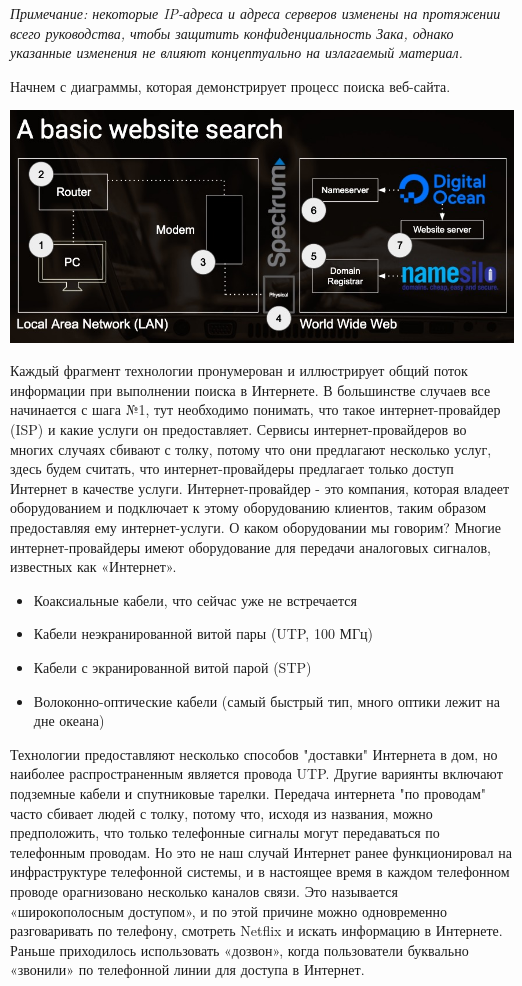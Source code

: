 \documentclass{article}
\begin{document}
\emph{Примечание: некоторые IP-адреса и адреса серверов изменены на
протяжении всего руководства, чтобы защитить конфиденциальность Зака,
однако указанные изменения не влияют концептуально на излагаемый
материал.}

Начнем с диаграммы, которая демонстрирует процесс поиска веб-сайта.

\includegraphics{blog/2019/bash-essentials/basic-web-search.jpg}

Каждый фрагмент технологии пронумерован и иллюстрирует общий поток
информации при выполнении поиска в Интернете. В большинстве случаев все
начинается с шага №1, тут необходимо понимать, что такое
интернет-провайдер (ISP) и какие услуги он предоставляет. Сервисы
интернет-провайдеров во многих случаях сбивают с толку, потому что они
предлагают несколько услуг, здесь будем считать, что интернет-провайдеры
предлагает только доступ Интернет в качестве услуги. Интернет-провайдер
- это компания, которая владеет оборудованием и подключает к этому
оборудованию клиентов, таким образом предоставляя ему интернет-услуги. О
каком оборудовании мы говорим? Многие интернет-провайдеры имеют
оборудование для передачи аналоговых сигналов, известных как «Интернет».

\begin{itemize}
\tightlist
\item
  Коаксиальные кабели, что сейчас уже не встречается
\item
  Кабели неэкранированной витой пары (UTP, 100 МГц)
\item
  Кабели с экранированной витой парой (STP)
\item
  Волоконно-оптические кабели (самый быстрый тип, много оптики лежит на
  дне океана)
\end{itemize}

Технологии предоставляют несколько способов "доставки" Интернета в дом,
но наиболее распространенным является провода UTP. Другие вариянты
включают подземные кабели и спутниковые тарелки. Передача интернета "по
проводам" часто сбивает людей с толку, потому что, исходя из названия,
можно предположить, что только телефонные сигналы могут передаваться по
телефонным проводам. Но это не наш случай Интернет ранее функционировал
на инфраструктуре телефонной системы, и в настоящее время в каждом
телефонном проводе орагнизовано несколько каналов связи. Это называется
«широкополосным доступом», и по этой причине можно одновременно
разговаривать по телефону, смотреть Netflix и искать информацию в
Интернете. Раньше приходилось использовать «дозвон», когда пользователи
буквально «звонили» по телефонной линии для доступа в Интернет.
\end{document}
